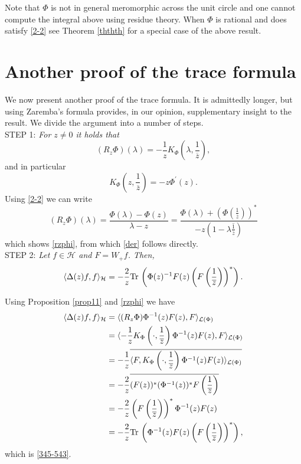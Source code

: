 \documentclass[12pt]{amsart}
\theoremstyle{definition}
\theoremstyle{remark}
\numberwithin{equation}{section}
\begin{document}
      Note that $\Phi$ is not in general meromorphic across the unit circle and one cannot compute the integral above using residue theory.
      When $\Phi$ is rational and does satisfy \eqref{2-2} see Theorem \ref{ththth} for a special case of the above result.


\section{Another proof of the trace formula}
\setcounter{equation}{0}
\label{tr2}
We now present another proof of the trace formula. It is admittedly longer, but using Zaremba's formula provides, in our opinion, supplementary insight to the result.
We divide the argument into a number of steps.\\




STEP 1: {\sl For $z\not=0$ it holds that}
\begin{equation}
  (R_z\Phi)(\lambda)=-\frac{1}{z}K_\Phi\left(\lambda,\frac{1}{\overline{z}}\right),
  \label{rzphi}
\end{equation}
and in particular
\begin{equation}
K_\Phi\left(z,\frac{1}{\overline{z}}\right)=-z\Phi^{\prime}(z).
  \label{der}
  \end{equation}
Using \eqref{2-2} we can write
\[
  (R_z\Phi)(\lambda)=\frac{\Phi(\lambda)-\Phi(z)}{\lambda-z}
  =\frac{\Phi(\lambda)+\left(\Phi\left(\frac{1}{\overline{z}}\right)\right)^*}{-{z}\left(1-\lambda{\overline{\frac{1}{\overline{z}}}}\right)}
  \]
which shows \eqref{rzphi}, from which \eqref{der} follows directly.\\

STEP 2: {\sl Let $f\in\mathcal H$ and $F=W_+f$. Then,}
\begin{equation}
  \label{345-543}
\langle \Delta(z)f,f\rangle_{\mathcal H}=-\frac{2}{z}{\rm Tr}\,\left(\Phi(z)^{-1}F(z)\left(F\left(\frac{1}{\overline{z}}\right)\right)^*\right).
    \end{equation}

    Using Proposition \ref{prop11} and \eqref{rzphi} we have
    \[
      \begin{split}
        \langle \Delta(z)f,f\rangle_{\mathcal H}&=\langle(R_z\Phi)\Phi^{-1}(z)F(z),F\rangle_{\mathcal L(\Phi)}\\
        &=\langle -\frac{1}{z}K_\Phi\left(\cdot,\frac{1}{\overline{z}}\right)\Phi^{-1}(z)F(z),F\rangle_{\mathcal L(\Phi)}\\
        &=-\frac{1}{z}\overline{\langle F,K_\Phi\left(\cdot,\frac{1}{\overline{z}}\right)\Phi^{-1}(z)F(z)\rangle_{\mathcal L(\Phi)}}\\
        &=-\frac{2}{z}\overline{(F(z))^*(\Phi^{-1}(z))^*F\left(\frac{1}{\overline{z}}\right)}\\
        &=-\frac{2}{z}\left(F\left(\frac{1}{\overline{z}}\right)\right)^*\Phi^{-1}(z)F(z)\\
        &=-\frac{2}{z}{\rm Tr}\,\left(\Phi^{-1}(z)F(z)\left(F\left(\frac{1}{\overline{z}}\right)\right)^*\right),
      \end{split}
    \]
    which is \eqref{345-543}.\\
\end{document}
